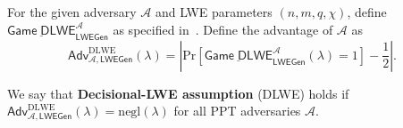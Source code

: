 \documentclass{template}
\begin{document}
\begin{definition}\label{def:decision-lwe-assumption}
    For the given adversary $\mathcal{A}$ and LWE parameters $(n,m,q,\chi)$,
    define $\underline{\mathsf{Game} \;
    \mathsf{DLWE}}_{\mathsf{LWEGen}}^{\mathcal{A}}$ as specified
    in~. Define the advantage of $\mathcal{A}$ as
    \begin{equation*}
        \mathsf{Adv}^{\text{DLWE}}_{\mathcal{A},\mathsf{LWEGen}}(\lambda) = \left|\text{Pr}\left[\underline{\mathsf{Game} \;
    \mathsf{DLWE}}_{\mathsf{LWEGen}}^{\mathcal{A}}(\lambda) = 1\right] - \frac{1}{2}\right|.
    \end{equation*}

    We say that \textbf{Decisional-LWE assumption} (DLWE) holds if
    $\mathsf{Adv}^{\text{DLWE}}_{\mathcal{A},\mathsf{LWEGen}}(\lambda)=\text{negl}(\lambda)$
    for all PPT adversaries $\mathcal{A}$.
\end{definition}
\end{document}
